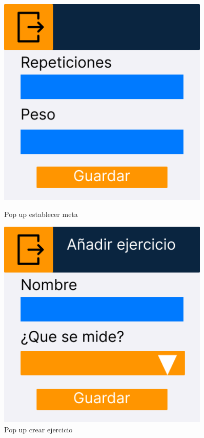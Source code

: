 \begin{figure}[H]
   \centering
   \begin{minipage}{0.45\textwidth}
      \centering
      \includegraphics[width=0.9\textwidth]{fotos/Frame 45.png}
      \caption{Pop up establecer meta}
      \label{fig:Pop up establecer meta}
   \end{minipage}%
   \hspace{0.5cm}
   \begin{minipage}{0.45\textwidth}
      \centering
      \includegraphics[width=0.9\textwidth]{fotos/Frame 64.png}
      \caption{Pop up crear ejercicio}
      \label{fig:Pop up crear ejercicio}
   \end{minipage}
\end{figure}

